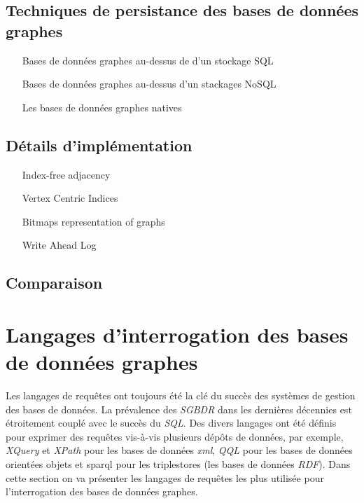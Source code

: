   \subsection{Techniques de persistance des bases de données graphes}
  \label{sec:persistence-tech}

  \begin{itemize}
  \item [Bases de données graphes au-dessus de d'un stockage SQL]
  \item [Bases de données graphes au-dessus d'un stackages NoSQL]
  \item [Les bases de données graphes natives]
  \end{itemize}

  \subsection{Détails d'implémentation}
  \label{graph-internals}
  \begin{itemize}
  \item [Index-free adjacency]
  \item [Vertex Centric Indices]
  \item [Bitmaps representation of graphs]
  \item [Write Ahead Log]
  \end{itemize}

  \subsection{Comparaison}
  \label{graphdb-comp}

\newpage
\section{Langages d'interrogation des bases de données graphes}
\label{query-languages}

Les langages de requêtes ont toujours été la clé du succès des
systèmes de gestion des bases de données. La prévalence des
\emph{\acrshort{SGBDR}} dans les dernières décennies est étroitement
couplé avec le succès du \emph{SQL}. Des divers langages ont été
définis pour exprimer des requêtes vis-à-vis plusieurs dépôts de
données, par exemple, \emph{XQuery} \cite{boag2002xquery} et
\emph{XPath} \cite{clark1999xml} pour les bases de données
\emph{\acrshort{xml}}, \emph{QQL} \cite{alashqur1989oql} pour les
bases de données orientées objets et \acrshort{sparql}
\cite{prud2008sparql} pour les triplestores (les bases de données
\emph{RDF}). Dans cette section on va présenter les langages de
requêtes les plus utilisée pour l'interrogation des bases de données
graphes.


